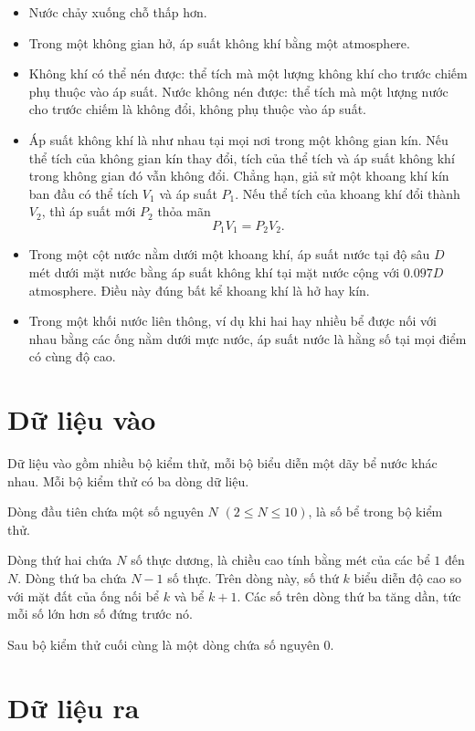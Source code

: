 \documentclass[11pt]{article}
\begin{document}
\begin{itemize}
  \item Nước chảy xuống chỗ thấp hơn.
  \item Trong một không gian hở, áp suất không khí bằng một atmosphere.
  \item Không khí có thể nén được: thể tích mà một lượng không khí cho trước
  chiếm phụ thuộc vào áp suất. Nước không nén được: thể tích mà một lượng nước
  cho trước chiếm là không đổi, không phụ thuộc vào áp suất.
  \item Áp suất không khí là như nhau tại mọi nơi trong một không gian kín.
  Nếu thể tích của không gian kín thay đổi, tích của thể tích và áp suất không
  khí trong không gian đó vẫn không đổi. Chẳng hạn, giả sử một khoang khí kín
  ban đầu có thể tích $V_1$ và áp suất $P_1$. Nếu thể tích của khoang khí đổi
  thành $V_2$, thì áp suất mới $P_2$ thỏa mãn
  \[
    P_1V_1 = P_2V_2.
  \]
  \item Trong một cột nước nằm dưới một khoang khí, áp suất nước tại độ sâu
  $D$ mét dưới mặt nước bằng áp suất không khí tại mặt nước cộng với
  $0.097D$ atmosphere. Điều này đúng bất kể khoang khí là hở hay kín.
  \item Trong một khối nước liên thông, ví dụ khi hai hay nhiều bể được nối
  với nhau bằng các ống nằm dưới mực nước, áp suất nước là hằng số tại mọi
  điểm có cùng độ cao.
\end{itemize}

\section*{Dữ liệu vào}

Dữ liệu vào gồm nhiều bộ kiểm thử, mỗi bộ biểu diễn một dãy bể nước khác
nhau. Mỗi bộ kiểm thử có ba dòng dữ liệu.

Dòng đầu tiên chứa một số nguyên $N$ $(2\le N\le 10)$, là số bể trong bộ kiểm
thử.

Dòng thứ hai chứa $N$ số thực dương, là chiều cao tính bằng mét của các bể
$1$ đến $N$. Dòng thứ ba chứa $N-1$ số thực. Trên dòng này, số thứ $k$ biểu
diễn độ cao so với mặt đất của ống nối bể $k$ và bể $k+1$. Các số trên dòng
thứ ba tăng dần, tức mỗi số lớn hơn số đứng trước nó.

Sau bộ kiểm thử cuối cùng là một dòng chứa số nguyên $0$.

\section*{Dữ liệu ra}
\end{document}
